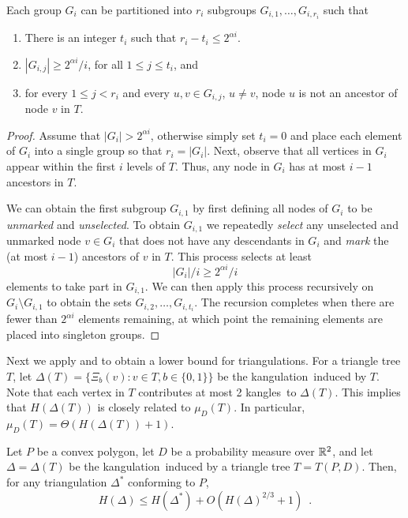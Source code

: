 \documentclass[charterfonts,lotsofwhite]{patmorin}
\newcommand{\kangles}{kangles}
\newcommand{\kangulation}{kangulation}
\begin{document}
\begin{lem}
Each group $G_i$ can be partitioned into $r_i$ subgroups
$G_{i,1},\ldots,G_{i,r_i}$ such that
\begin{enumerate}
\item There is an integer $t_i$ such that $r_i-t_i\le 2^{\alpha i}$.

\item $|G_{i,j}| \ge 2^{\alpha i} / i$, for all $1\le j \le t_i$, and

\item for every $1\le j< r_i$ and every $u,v\in G_{i,j}$, $u\neq v$, 
node $u$ is not an ancestor of node $v$ in $T$. 
\end{enumerate}
\end{lem}

\begin{proof}
Assume that $|G_i|> 2^{\alpha i}$, otherwise simply set $t_i=0$ and
place each element of $G_i$ into a single group so that $r_i=|G_i|$.
Next, observe that all vertices in $G_i$ appear within the first $i$ levels
of $T$.  Thus, any node in $G_i$ has at most $i-1$ ancestors in $T$.  

We can obtain the first subgroup $G_{i,1}$ by first defining all nodes of
$G_i$ to be \emph{unmarked} and \emph{unselected}.  To obtain
$G_{i,1}$ we repeatedly \emph{select} any unselected and unmarked
node $v\in G_i$ that does not have any descendants in $G_i$ and
\emph{mark} the (at most $i-1$) ancestors of $v$ in $T$.  This
process selects at least
\[
   |G_i|/i \ge 2^{\alpha i}/i
\] 
elements to take part in $G_{i,1}$.  We can then apply this process
recursively on $G_i\setminus G_{i,1}$ to obtain the sets
$G_{i,2},\ldots,G_{i,t_i}$.  The recursion completes when there are
fewer than $2^{\alpha i}$ elements remaining, at which point the
remaining elements are placed into singleton groups.
\end{proof}

Next we apply  and  to obtain a
lower bound for triangulations.  For a triangle tree $T$, let
$\Delta(T)=\{\Xi_b(v) : v\in T, b\in\{0,1\}  \}$ be the \kangulation\
induced by $T$.  Note that each vertex in $T$ contributes at most 2
\kangles\ to $\Delta(T)$.  This implies that $H(\Delta(T))$ is closely
related to $\mu_D(T)$.  In particular, $\mu_D(T)=\Theta(H(\Delta(T))+1)$.

\begin{lem}
Let $P$ be a convex polygon, let $D$ be a probability measure over
$\mathbb{R}^2$, and 
let $\Delta=\Delta(T)$ be the \kangulation\ induced by a triangle tree
$T=T(P,D)$. Then, for any triangulation $\Delta^*$ conforming to $P$,
\[
    H(\Delta) \le H(\Delta^*) + O(H(\Delta)^{2/3}+1) \enspace .
\]
\end{lem}
\end{document}
